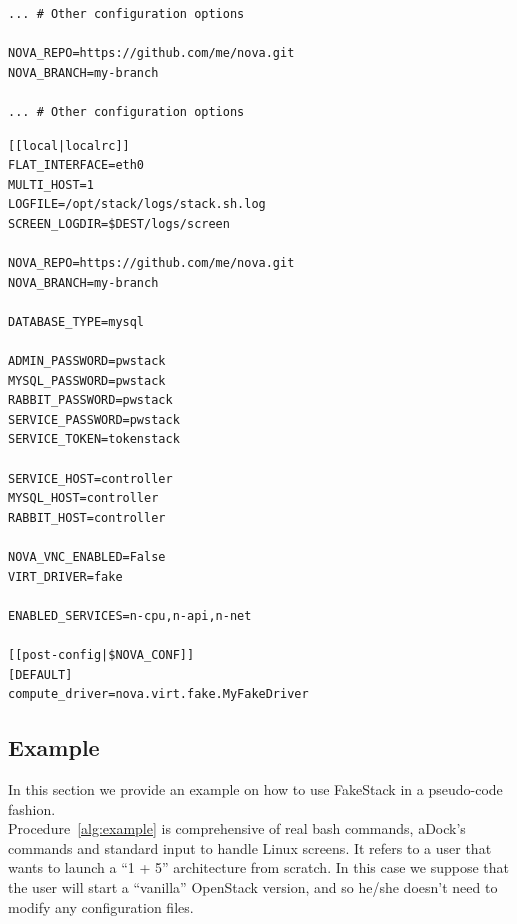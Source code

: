 \begin{lstlisting}[float, floatplacement=H, caption={Change repository URL}, label={lst:change_repo}, numbers=none]
... # Other configuration options

NOVA_REPO=https://github.com/me/nova.git
NOVA_BRANCH=my-branch

... # Other configuration options
\end{lstlisting}

\begin{lstlisting}[float, floatplacement=H, caption={Complete \texttt{local.conf} example for compute node}, label={lst:localconf_ex}]
[[local|localrc]]
FLAT_INTERFACE=eth0
MULTI_HOST=1
LOGFILE=/opt/stack/logs/stack.sh.log
SCREEN_LOGDIR=$DEST/logs/screen

NOVA_REPO=https://github.com/me/nova.git
NOVA_BRANCH=my-branch

DATABASE_TYPE=mysql

ADMIN_PASSWORD=pwstack
MYSQL_PASSWORD=pwstack
RABBIT_PASSWORD=pwstack
SERVICE_PASSWORD=pwstack
SERVICE_TOKEN=tokenstack

SERVICE_HOST=controller
MYSQL_HOST=controller
RABBIT_HOST=controller

NOVA_VNC_ENABLED=False
VIRT_DRIVER=fake

ENABLED_SERVICES=n-cpu,n-api,n-net

[[post-config|$NOVA_CONF]]
[DEFAULT]
compute_driver=nova.virt.fake.MyFakeDriver
\end{lstlisting}

\subsection{Example}
\label{sub:fakestack_ex}
In this section we provide an example on how to use FakeStack in a pseudo-code fashion.\\
Procedure~\ref{alg:example} is comprehensive of real bash commands, aDock's commands and standard input to handle Linux screens. It refers to a user that wants to launch a ``1 + 5'' architecture from scratch. In this case we suppose that the user will start a ``vanilla'' OpenStack version, and so he/she doesn't need to modify any configuration files.

